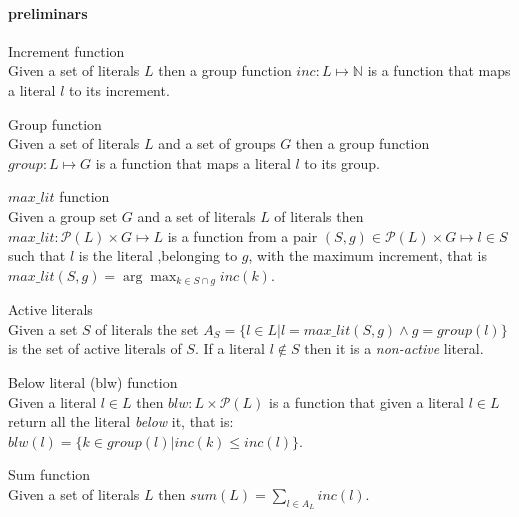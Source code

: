 
\paragraph*{preliminars}

\begin{definition}{Increment function}\\    
    Given a set of literals $L$  then a group function $inc: L \mapsto \mathbb{N}$ is a function that
    maps a literal $l$ to its increment. 
\end{definition}

\begin{definition}{Group function}\\
    Given a set of literals $L$ and a set of groups $G$ then a group function $group: L \mapsto G$ is a function that
    maps a literal $l$ to its group. 
\end{definition}

\begin{definition}{$max\_lit$ function}\\
    Given a group set $G$ and a set of literals $L$ of literals then $max\_lit: \mathcal{P}(L) \times G \mapsto L$ is a function 
    from a pair $(S,g) \in \mathcal{P}(L) \times G \mapsto l \in S$ such that $l$ is the literal
    ,belonging to $g$, with the maximum increment, that is  $max\_lit(S,g) = \arg\max_{k \in S \cap g} inc(k)$.
\end{definition}

\begin{definition}{Active literals}\\
    Given a set $S$ of literals the set $A_S = \{ l \in L | l = max\_lit(S,g) \land g = group(l) \}$
    is the set of active literals of $S$. If a literal $l \not\in S$ then it is a \textit{non-active} literal.
\end{definition}

\begin{definition}{Below literal (blw) function}\\
    Given a literal $l \in L$ then $blw: L \times \mathcal{P}(L)$ is a function that given a literal $l \in L$
    return all the literal \textit{below} it, that is: $blw(l) = \{ k \in group(l) | inc(k) \le inc(l) \}$. 
\end{definition}

\begin{definition}{Sum function}\\
    Given a set of literals $L$ then $sum(L) = \sum_{l \in A_L} {inc(l)}$.
\end{definition}

